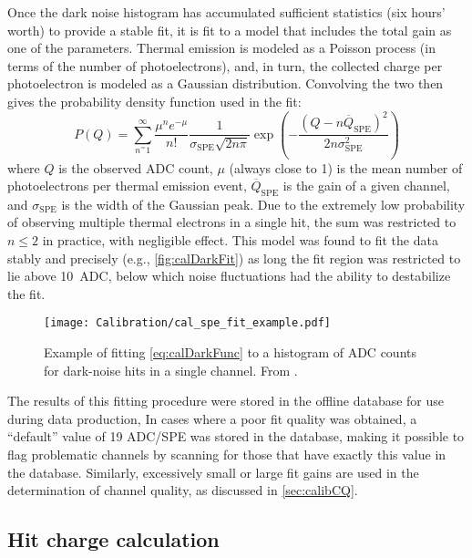 \documentclass[../thesis.tex]{subfiles}
\begin{document}
Once the dark noise histogram has accumulated sufficient statistics (six hours' worth) to provide a stable fit, it is fit to a model that includes the total gain as one of the parameters. Thermal emission is modeled as a Poisson process (in terms of the number of photoelectrons), and, in turn, the collected charge per photoelectron is modeled as a Gaussian distribution. Convolving the two then gives the probability density function used in the fit:
\begin{equation}
  \label{eq:calDarkFunc}
  P(Q) = \sum_{n^=1}^{\infty} \frac{\mu^n e^{-\mu}}{n!} \frac{1}{\sigma_{\mathrm{SPE}}\sqrt{2n\pi}} \exp\left(-\frac{(Q - n\overline Q_{\mathrm{SPE}})^2}{2n\sigma_{\mathrm{SPE}}^2}\right)
\end{equation}
where $Q$ is the observed ADC count, $\mu$ (always close to 1) is the mean number of photoelectrons per thermal emission event, $\overline Q_{\mathrm{SPE}}$ is the gain of a given channel, and $\sigma_{\mathrm{SPE}}$ is the width of the Gaussian peak. Due to the extremely low probability of observing multiple thermal electrons in a single hit, the sum was restricted to $n \le 2$ in practice, with negligible effect. This model was found to fit the data stably and precisely (e.g., \autoref{fig:calDarkFit}) as long the fit region was restricted to lie above 10~ADC, below which noise fluctuations had the ability to destabilize the fit.

\begin{figure}[ht]
  \texttt{[image: Calibration/cal\_spe\_fit\_example.pdf]}
  \caption{Example of fitting \autoref{eq:calDarkFunc} to a histogram of ADC counts for dark-noise hits in a single channel. From \cite{An_2017}.}
  \label{fig:calDarkFit}
\end{figure}

The results of this fitting procedure were stored in the offline database for use during data production, In cases where a poor fit quality was obtained, a ``default'' value of 19 ADC/SPE was stored in the database, making it possible to flag problematic channels by scanning for those that have exactly this value in the database. Similarly, excessively small or large fit gains are used in the determination of channel quality, as discussed in \autoref{sec:calibCQ}.

\subsection{Hit charge calculation}
\label{sec:calibHitCharge}
\end{document}
